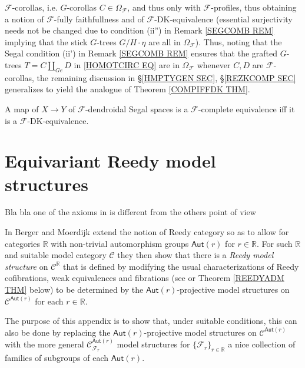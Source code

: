 \documentclass[a4paper,10pt
,draft
]{article}%
\begin{document}
$\mathcal{F}$-corollas, i.e. $G$-corollas
$C \in \Omega_{\mathcal{F}}$,
and thus only with $\mathcal{F}$-profiles, thus obtaining a notion of $\mathcal{F}$-fully faithfullness and of $\mathcal{F}$-DK-equivalence 
(essential surjectivity needs not be changed due to condition (ii'') in Remark \ref{SEGCOMB REM} implying that the stick $G$-trees $G/H \cdot \eta$ are all in $\Omega_{\mathcal{F}}$).
Thus, noting that the Segal condition (ii') in Remark \ref{SEGCOMB REM}
ensures that the grafted $G$-trees 
$T=C \amalg_{Ge} D$ in \eqref{HOMOTCIRC EQ}
are in $\Omega_{\mathcal{F}}$
whenever $C,D$ are $\mathcal{F}$-corollas,
the remaining discussion in 
\S \ref{HMPTYGEN SEC}, \S \ref{REZKCOMP SEC}
generalizes to yield the analogue of 
Theorem \ref{COMPIFFDK THM}.
\begin{theorem}\label{FCOMPIFFDK THM}
A map of $X \to Y$ of $\mathcal{F}$-dendroidal Segal spaces is a $\mathcal{F}$-complete equivalence iff it is a $\mathcal{F}$-DK-equivalence.
\end{theorem}



\appendix

\section{Equivariant Reedy model structures}\label{EQREED AP}


{\color{blue} Bla bla one of the axioms in \cite{BM11} is different from the others point of view}

In \cite{BM11} Berger and Moerdijk extend the notion of Reedy category so as to allow for categories $\mathbb{R}$
 with non-trivial automorphism groups 
 $\mathsf{Aut}(r)$ for $r \in \mathbb{R}$.
For such $\mathbb{R}$ and suitable model category $\mathcal{C}$ they then show that there is a 
\textit{Reedy model structure}
on $\mathcal{C}^{\mathbb{R}}$
that is defined by modifying the usual characterizations of
Reedy cofibrations, weak equivalences and fibrations
(see \cite[Thm. 1.6]{BM11} or
Theorem \ref{REEDYADM THM} below)
 to be determined by the $\mathsf{Aut}(r)$-projective model structures
on $\mathcal{C}^{\mathsf{Aut}(r)}$
for each $r \in \mathbb{R}$. 

The purpose of this appendix is to show that,
under suitable conditions, this can also be done by replacing
the $\mathsf{Aut}(r)$-projective model structures
on $\mathcal{C}^{\mathsf{Aut}(r)}$
with the more general 
$\mathcal{C}^{\mathsf{Aut}(r)}_{\mathcal{F}_r}$
model structures for 
$\{\mathcal{F}_r\}_{r \in \mathbb{R}}$
a nice collection of families of subgroups of each 
$\mathsf{Aut}(r)$.
\end{document}
